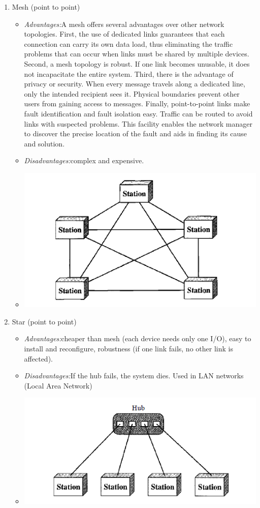 \documentclass[12pt,a4paper]{report}
\begin{document}
\begin{itemize}
\begin{enumerate}
\item Mesh (point to point)
\begin{itemize}
\item\textit{Advantages:}A mesh offers several advantages over other network topologies. First, the use of dedicated links guarantees that each connection can carry its own data load, thus eliminating the traffic problems that can occur when links must be shared by multiple devices. Second, a mesh topology is robust. If one link becomes unusable, it does not incapacitate the entire system. Third, there is the advantage of privacy or security. When every message travels along a dedicated line, only the intended recipient sees it. Physical boundaries prevent other users from gaining access to messages. Finally, point-to-point links make fault identification and fault isolation easy. Traffic can be routed to avoid  links with suspected problems. This facility enables the network manager to discover the precise location of the fault and aids in finding its cause and solution.
\item\textit{Disadvantages:}complex and expensive.
\item \includegraphics[scale=0.7]{mesh}
\end{itemize}

\item Star (point to point)
\begin{itemize}
\item\textit{Advantages:}cheaper than mesh (each device needs only one I/O), easy to install and reconfigure, robustness (if one link fails, no other link is affected).
\item\textit{Disadvantages:}If the hub fails, the system dies. Used in LAN networks (Local Area Network)
\item \includegraphics[scale=0.7]{star}
\end{itemize}


\end{enumerate}
\end{itemize}
\end{document}
